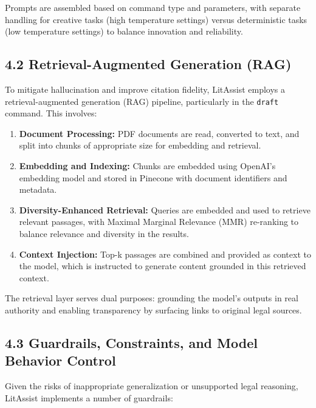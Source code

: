 \documentclass[12pt,a4paper]{article}
\begin{document}
Prompts are assembled based on command type and parameters, with separate handling for creative tasks (high temperature settings) versus deterministic tasks (low temperature settings) to balance innovation and reliability.

\subsection*{4.2 Retrieval-Augmented Generation (RAG)}

To mitigate hallucination and improve citation fidelity, LitAssist employs a retrieval-augmented generation (RAG) pipeline, particularly in the \texttt{draft} command. This involves:

\begin{enumerate}

\item \textbf{Document Processing:} PDF documents are read, converted to text, and split into chunks of appropriate size for embedding and retrieval.

\item \textbf{Embedding and Indexing:} Chunks are embedded using OpenAI's embedding model and stored in Pinecone with document identifiers and metadata.

\item \textbf{Diversity-Enhanced Retrieval:} Queries are embedded and used to retrieve relevant passages, with Maximal Marginal Relevance (MMR) re-ranking to balance relevance and diversity in the results.

\item \textbf{Context Injection:} Top-k passages are combined and provided as context to the model, which is instructed to generate content grounded in this retrieved context.

\end{enumerate}

The retrieval layer serves dual purposes: grounding the model's outputs in real authority and enabling transparency by surfacing links to original legal sources.

\subsection*{4.3 Guardrails, Constraints, and Model Behavior Control}

Given the risks of inappropriate generalization or unsupported legal reasoning, LitAssist implements a number of guardrails:
\end{document}
